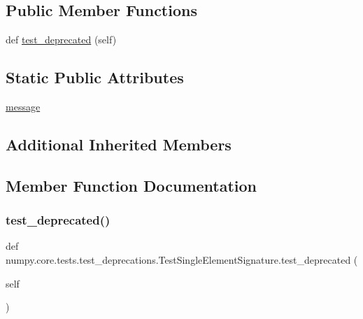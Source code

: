 \subsection*{Public Member Functions}
\begin{DoxyCompactItemize}
\item 
def \hyperlink{classnumpy_1_1core_1_1tests_1_1test__deprecations_1_1TestSingleElementSignature_a53337af56901216dad67d87093d67e9d}{test\+\_\+deprecated} (self)
\end{DoxyCompactItemize}
\subsection*{Static Public Attributes}
\begin{DoxyCompactItemize}
\item 
\hyperlink{classnumpy_1_1core_1_1tests_1_1test__deprecations_1_1TestSingleElementSignature_a96e61fac0423b757bec2a23b46fe3f99}{message}
\end{DoxyCompactItemize}
\subsection*{Additional Inherited Members}


\subsection{Member Function Documentation}
\mbox{\label{classnumpy_1_1core_1_1tests_1_1test__deprecations_1_1TestSingleElementSignature_a53337af56901216dad67d87093d67e9d}} 
\subsubsection{\texorpdfstring{test\+\_\+deprecated()}{test\_deprecated()}}
{\footnotesize\ttfamily def numpy.\+core.\+tests.\+test\+\_\+deprecations.\+Test\+Single\+Element\+Signature.\+test\+\_\+deprecated (\begin{DoxyParamCaption}\item[{}]{self }\end{DoxyParamCaption})}




